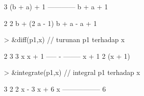 \documentclass[a4paper,10pt]{article}
\begin{document}
\begin{eulernotebook}
\begin{eulercomment}
\begin{eulercomment}
\begin{euleroutput}
                                      3
                               (b + a)  + 1
                               ------------
                                b + a + 1
  
  
                       2                  2
                      b  + (2 a - 1) b + a  - a + 1
  
\end{euleroutput}
\begin{eulerprompt}
> &diff(p1,x) // turunan p1 terhadap x
\end{eulerprompt}
\begin{euleroutput}
  
                                2      3
                             3 x      x  + 1
                             ----- - --------
                             x + 1          2
                                     (x + 1)
  
\end{euleroutput}
\begin{eulerprompt}
> &integrate(p1,x) // integral p1 terhadap x 
\end{eulerprompt}
\begin{euleroutput}
  
                               3      2
                            2 x  - 3 x  + 6 x
                            -----------------
                                    6
  

\end{euleroutput}
\end{eulercomment}
\end{eulercomment}
\end{eulernotebook}
\end{document}
